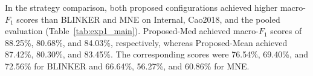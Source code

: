 In the strategy comparison, both proposed configurations achieved higher macro-$F_1$ scores than BLINKER and MNE on Internal, Cao2018, and the pooled evaluation (Table~\ref{tab:exp1_main}). Proposed-Med achieved macro-$F_1$ scores of 88.25\%, 80.68\%, and 84.03\%, respectively, whereas Proposed-Mean achieved 87.42\%, 80.30\%, and 83.45\%. The corresponding scores were 76.54\%, 69.40\%, and 72.56\% for BLINKER and 66.64\%, 56.27\%, and 60.86\% for MNE.
